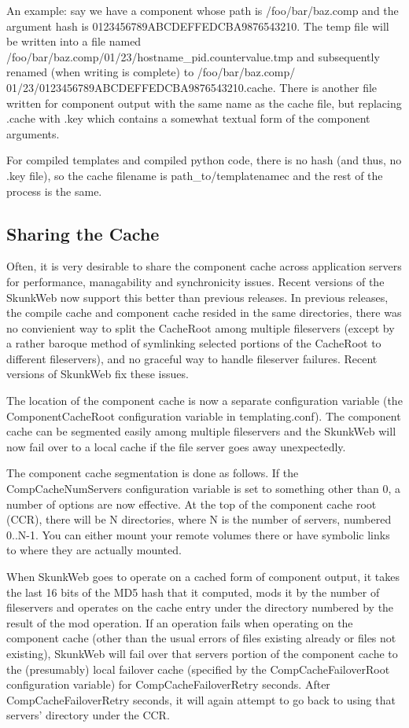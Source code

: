 \documentclass[titlepage]{manual}
\begin{document}
An example: say we have a component whose path is /foo/bar/baz.comp
and the argument hash is 0123456789ABCDEFFEDCBA9876543210. The temp
file will be written into a file named
/foo/bar/baz.comp/01/23/hostname\_pid.countervalue.tmp and subsequently
renamed (when writing is complete) to /foo/bar/baz.comp/
01/23/0123456789ABCDEFFEDCBA9876543210.cache. There is another file
written for component output with the same name as the cache file, but
replacing .cache with .key which contains a somewhat textual form of
the component arguments.

For compiled templates and compiled python code, there is no hash (and
thus, no .key file), so the cache filename is path\_to/templatenamec
and the rest of the process is the same.

\subsection{Sharing the Cache}
Often, it is very desirable to share the component cache across
application servers for performance, managability and synchronicity
issues. Recent versions of the SkunkWeb now support this better than
previous releases. In previous releases, the compile cache and
component cache resided in the same directories, there was no
convienient way to split the CacheRoot among multiple fileservers
(except by a rather baroque method of symlinking selected portions of
the CacheRoot to different fileservers), and no graceful way to handle
fileserver failures. Recent versions of SkunkWeb fix these issues.
   
The location of the component cache is now a separate configuration
variable (the ComponentCacheRoot configuration variable in
templating.conf). The component cache can be segmented easily among
multiple fileservers and the SkunkWeb will now fail over to a local
cache if the file server goes away unexpectedly.
   
The component cache segmentation is done as follows. If the
CompCacheNumServers configuration variable is set to something other
than 0, a number of options are now effective. At the top of the
component cache root (CCR), there will be N directories, where N is
the number of servers, numbered 0..N-1. You can either mount your
remote volumes there or have symbolic links to where they are actually
mounted.
   
When SkunkWeb goes to operate on a cached form of component output, it
takes the last 16 bits of the MD5 hash that it computed, mods it by
the number of fileservers and operates on the cache entry under the
directory numbered by the result of the mod operation. If an operation
fails when operating on the component cache (other than the usual
errors of files existing already or files not existing), SkunkWeb will
fail over that servers portion of the component cache to the
(presumably) local failover cache (specified by the
CompCacheFailoverRoot configuration variable) for
CompCacheFailoverRetry seconds. After CompCacheFailoverRetry seconds,
it will again attempt to go back to using that servers' directory
under the CCR.
   
\end{document}

